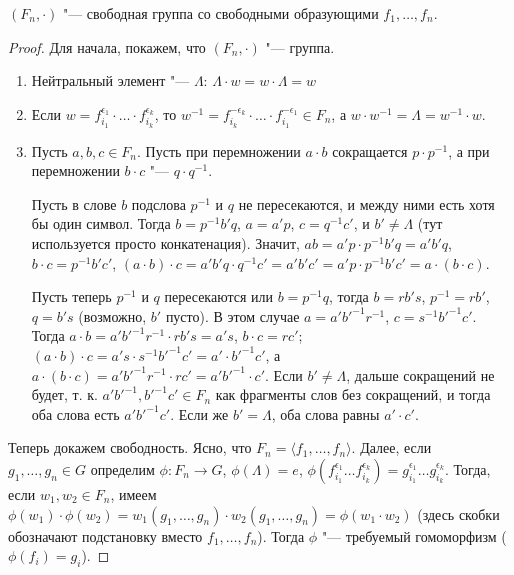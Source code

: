 \documentclass[main]{subfiles}
\begin{document}
\begin{theorem}
  $(F_n, \cdot)$ "--- свободная группа со свободными образующими
  $f_1, \dots, f_n$.
\end{theorem}
\begin{proof}
  Для начала, покажем, что $(F_n, \cdot)$ "--- группа.
  \begin{enumerate}
    \item Нейтральный элемент "--- $\Lambda$:
      $\Lambda \cdot w = w \cdot \Lambda = w$
    \item Если
      $w = f_{i_1}^{\epsilon_1} \cdot \dots \cdot f_{i_k}^{\epsilon_k}$,
      то $w^{-1} = f_{i_k}^{-\epsilon_k} \cdot \dots \cdot f_{i_1}^{-\epsilon_1}
      \in F_n$, а $w \cdot w^{-1} = \Lambda = w^{-1} \cdot w$.
    \item Пусть $a, b, c \in F_n$.
      Пусть при перемножении $a \cdot b$
      сокращается $p \cdot p^{-1}$,
      а при перемножении $b \cdot c$ "---
      $q \cdot q^{-1}$.

      Пусть в слове \( b \)
      подслова $p^{-1}$ и $q$ не пересекаются,
      и между ними есть хотя бы один символ.
      Тогда $b = p^{-1} b' q$,
      $a = a'p$, $c = q^{-1}c'$, и $b' \ne \Lambda$
      (тут используется просто конкатенация).
      Значит, $ab = a' p \cdot p^{-1} b' q = a'b'q$,
      $b \cdot c = p^{-1} b' c'$, $(a \cdot b) \cdot c =
      a' b' q \cdot q^{-1} c' = a' b' c' = a' p \cdot p^{-1} b' c'
      = a \cdot (b \cdot c)$.
      
      Пусть теперь $p^{-1}$ и $q$
      пересекаются или \( b = p^{-1} q \),
      тогда $b = r b' s$, $p^{-1} = rb'$, $q = b's$
      (возможно, $b'$ пусто).
      В этом случае $a = a' b'^{-1} r^{-1}$,
      $c = s^{-1} b'^{-1} c'$.
      Тогда $a \cdot b = a' b'^{-1} r^{-1} \cdot r b' s = a' s$,
      $b \cdot c = r c'$;
      $(a \cdot b) \cdot c = a' s \cdot s^{-1} b'^{-1}
      c' = a' \cdot b'^{-1} c'$,
      а $a \cdot (b \cdot c) = a' b'^{-1} r^{-1} \cdot r c' =
      a' b'^{-1} \cdot c'$.
      Если $b' \ne \Lambda$,
      дальше сокращений не будет,
      т. к. $a' b'^{-1}, b'^{-1} c' \in F_n$
      как фрагменты слов без сокращений,
      и тогда оба слова есть $a' b'^{-1} c'$.
      Если же $b' = \Lambda$, оба слова равны $a' \cdot c'$.
  \end{enumerate}
  
  Теперь докажем свободность.
  Ясно, что $F_n = \langle f_1, \dots, f_n \rangle$.
  Далее, если $g_1, \dots, g_n \in G$
  определим $\phi : F_n \to G$,
  $\phi(\Lambda) = e$,
  $\phi(f_{i_1}^{\epsilon_1} \dots f_{i_k}^{\epsilon_k})
  = g_{i_1}^{\epsilon_1} \dots g_{i_k}^{\epsilon_k}$.
  Тогда, если $w_1, w_2 \in F_n$, имеем
  $\phi(w_1) \cdot \phi(w_2) =
  w_1(g_1, \dots, g_n) \cdot w_2(g_1, \dots, g_n) =
  \phi(w_1 \cdot w_2)$
  (здесь скобки обозначают подстановку вместо $f_1, \dots, f_n$).
  Тогда $\phi$ "--- требуемый гомоморфизм
  ($\phi(f_i) = g_i$).
\end{proof}
\end{document}
